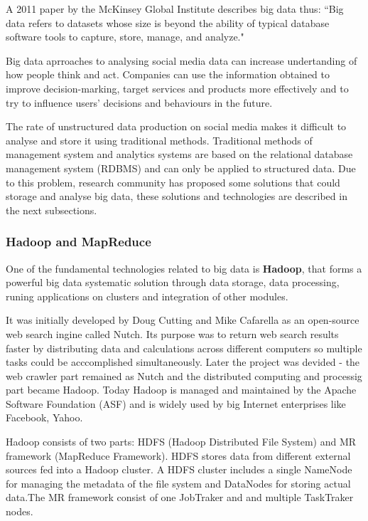 A 2011 paper by the McKinsey Global Institute describes big data thus: ``Big data refers to datasets whose size is beyond the ability of typical database software tools to capture, store, manage, and analyze."\cite{bigdata} 

Big data aprroaches to analysing social media data can increase undertanding of how people think and act. Companies can use the information obtained to improve decision-marking, target services and products more effectively and to try to influence users' decisions and behaviours in the future.\cite{POSTNOTE460}

The rate of unstructured data production on social media makes it difficult to analyse and store it using traditional methods. Traditional methods of management system and analytics systems are based on the relational database management system (RDBMS) and can only be applied to structured data.\cite{bdtech} Due to this problem, research community has proposed some solutions that could storage and analyse big data, these solutions and technologies are described in the next subsections.

\subsubsection{Hadoop and MapReduce}

One of the fundamental technologies related to big data is \textbf{Hadoop}, that forms a powerful big data systematic solution through data storage, data processing, runing applications on clusters and integration of other modules. 

It was initially developed by Doug Cutting and Mike Cafarella as an open-source web search ingine called Nutch. Its purpose was to return web search results faster by distributing data and calculations across different computers so multiple tasks could be acccomplished simultaneously. Later the project was devided - the web crawler part remained as Nutch and the distributed computing and processig part became Hadoop.\cite{sas} Today Hadoop is managed and maintained by the Apache Software Foundation (ASF) and is widely used by big Internet enterprises like Facebook, Yahoo. 

Hadoop consists of two parts: HDFS (Hadoop Distributed File System) and MR framework (MapReduce Framework). HDFS stores data from different external sources fed into a Hadoop cluster. A HDFS cluster includes a single NameNode for managing the metadata of the file system and DataNodes for storing actual data.The MR framework consist of one JobTraker and and multiple TaskTraker nodes.

